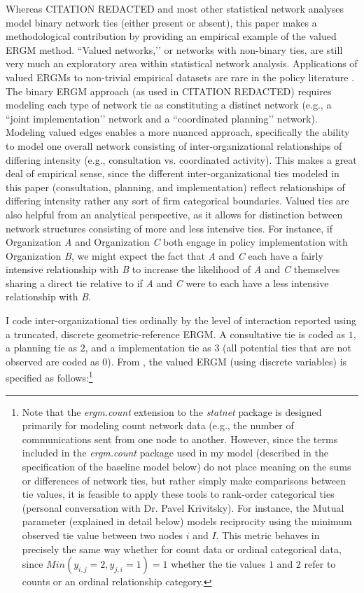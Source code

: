 \documentclass[12pt,a4paper,titlepage]{article}
\begin{document}
Whereas CITATION REDACTED and most other statistical network analyses model binary network ties (either present or absent), this paper makes a methodological contribution by providing an empirical example of the valued ERGM method. ``Valued networks,’’ or networks with non-binary ties, are still very much an exploratory area within statistical network analysis. Applications of valued ERGMs to non-trivial empirical datasets are rare in the policy literature \parencite{desmarais2012-a, krivitsky2012}. The binary ERGM approach (as used in CITATION REDACTED) requires modeling each type of network tie as constituting a distinct network (e.g., a ``joint implementation’’ network and a ``coordinated planning’’ network). Modeling valued edges enables a more nuanced approach, specifically the ability to model one overall network consisting of inter-organizational relationships of differing intensity (e.g., consultation vs. coordinated activity). This makes a great deal of empirical sense, since the different inter-organizational ties modeled in this paper (consultation, planning, and implementation) reflect relationships of differing intensity rather any sort of firm categorical boundaries. Valued ties are also helpful from an analytical perspective, as it allows for distinction between network structures consisting of more and less intensive ties. For instance, if Organization \textit{A} and Organization \textit{C} both engage in policy implementation with Organization \textit{B}, we might expect the fact that \textit{A} and \textit{C} each have a fairly intensive relationship with \textit{B} to increase the likelihood of \textit{A} and \textit{C} themselves sharing a direct tie relative to if \textit{A} and \textit{C} were to each have a less intensive relationship with \textit{B}.

I code inter-organizational ties ordinally by the level of interaction reported using a truncated, discrete geometric-reference ERGM. A consultative tie is coded as $1$, a planning tie as $2$, and a implementation tie as $3$ (all potential ties that are not observed are coded as $0$). From \textcite{krivitsky2012}, the valued ERGM (using discrete variables) is specified as follows:\footnote{Note that the \textit{ergm.count} extension to the \textit{statnet} package is designed primarily for modeling count network data (e.g., the number of communications sent from one node to another. However, since the terms included in the \textit{ergm.count} package used in my model (described in the specification of the baseline model below) do not place meaning on the sums or differences of network ties, but rather simply make comparisons between tie values, it is feasible to apply these tools to rank-order categorical ties (personal conversation with Dr. Pavel Krivitsky). For instance, the Mutual parameter (explained in detail below) models reciprocity using the minimum observed tie value between two nodes $i$ and $I$. This metric behaves in precisely the same way whether for count data or ordinal categorical data, since $Min(y_{i,j}=2,y_{j,i}=1)=1$ whether the tie values $1$ and $2$ refer to counts or an ordinal relationship category.} 
\end{document}
